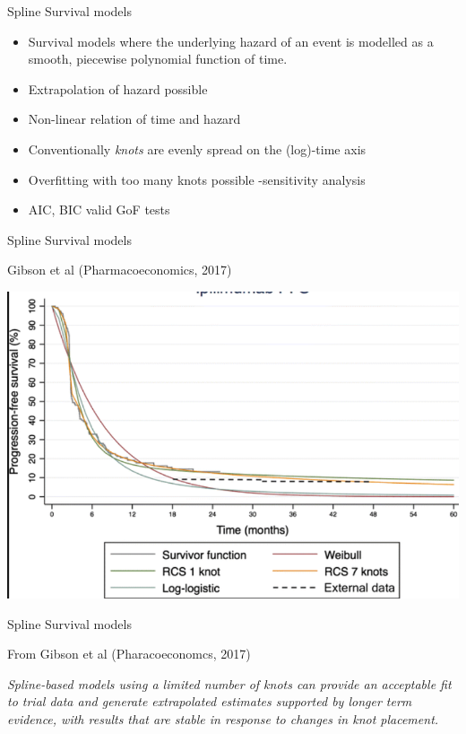 \documentclass[ignorenonframetext,]{beamer}
\providecommand{\tightlist}{%
  \setlength{\itemsep}{0pt}\setlength{\parskip}{0pt}}
\begin{document}
\begin{frame}{Spline Survival models}

\begin{itemize}
\tightlist
\item
  Survival models where the underlying hazard of an event is modelled as
  a smooth, piecewise polynomial function of time.
\item
  Extrapolation of hazard possible
\item
  Non-linear relation of time and hazard
\item
  Conventionally \emph{knots} are evenly spread on the (log)-time axis
\item
  Overfitting with too many knots possible -sensitivity analysis
\item
  AIC, BIC valid GoF tests
\end{itemize}

\end{frame}

\begin{frame}{Spline Survival models}

Gibson et al (Pharmacoeconomics, 2017)

\includegraphics[width=1\linewidth]{figures/flexsurv}

\end{frame}

\begin{frame}{Spline Survival models}

From Gibson et al (Pharacoeconomcs, 2017)

\emph{Spline-based models using a limited number of knots can provide an
acceptable fit to trial data and generate extrapolated estimates
supported by longer term evidence, with results that are stable in
response to changes in knot placement.}

\end{frame}
\end{document}
